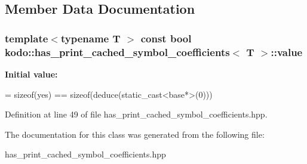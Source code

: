 \subsection{Member Data Documentation}
\hypertarget{classkodo_1_1has__print__cached__symbol__coefficients_abf91ff4e64e03f1de7fceb4badafa5c5}{
\subsubsection[{value}]{\setlength{\rightskip}{0pt plus 5cm}template$<$typename T $>$ const bool {\bf kodo\-::has\-\_\-print\-\_\-cached\-\_\-symbol\-\_\-coefficients}$<$ T $>$\-::value\hspace{0.3cm}{\ttfamily [static]}}}\label{classkodo_1_1has__print__cached__symbol__coefficients_abf91ff4e64e03f1de7fceb4badafa5c5}
{\bfseries Initial value\-:}
\begin{DoxyCode}
=
            \textcolor{keyword}{sizeof}(yes) == \textcolor{keyword}{sizeof}(deduce(static\_cast<base*>(0)))
\end{DoxyCode}


Definition at line 49 of file has\-\_\-print\-\_\-cached\-\_\-symbol\-\_\-coefficients.\-hpp.



The documentation for this class was generated from the following file\-:\begin{DoxyCompactItemize}
\item 
has\-\_\-print\-\_\-cached\-\_\-symbol\-\_\-coefficients.\-hpp\end{DoxyCompactItemize}
